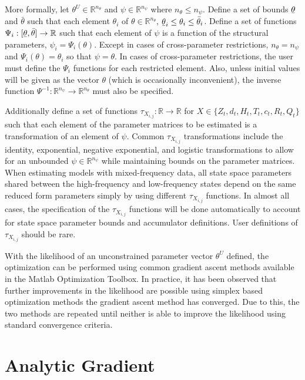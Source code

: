\documentclass[12pt]{article}
\newcommand{\ubar}[1]{\text{\b{$#1$}}}
\begin{document}
	More formally, let $\theta^U \in \mathbb{R}^{n_\theta}$ and $\psi \in \mathbb{R}^{n_\psi}$ where $n_\theta \leq n_\psi$. Define a set of bounds $\ubar{\theta}$  and $\bar{\theta}$ such that each element $\theta_i$ of $\theta \in \mathbb{R}^{n_\theta}$, $\ubar{\theta}_i \leq \theta_i \leq \bar{\theta}_i$. 
	Define a set of functions $\Psi_i: [\ubar{\theta}, \bar{\theta}] \rightarrow \mathbb{R}$ such that each element of $\psi$ is a function of the structural parameters, $\psi_i = \Psi_i(\theta)$. Except in cases of cross-parameter restrictions, $n_\theta = n_\psi$ and $\Psi_i(\theta) = \theta_i$ so that $\psi = \theta$. In cases of cross-parameter restrictions, the user must define the $\Psi_i$ functions for each restricted element. Also, unless initial values will be given as the vector $\theta$ (which is occasionally inconvenient), the inverse function $\Psi^{-1} : \mathbb{R}^{n_\psi} \rightarrow \mathbb{R}^{n_\theta}$ must also be specified.

	Additionally define a set of functions $\tau_{X_{i,j}}: \mathbb{R} \rightarrow \mathbb{R}$ for $X \in \{ Z_t, d_t, H_t, T_t, c_t, R_t, Q_t \}$ such that each element of the parameter matrices to be estimated is a transformation of an element of $\psi$. Common $\tau_{X_{i,j}}$ transformations include the identity, exponential, negative exponential, and logistic transformations to allow for an unbounded $\psi \in \mathbb{R}^{n_\psi}$ while maintaining bounds on the parameter matrices. When estimating models with mixed-frequency data, all state space parameters shared between the high-frequency and low-frequency states depend on the same reduced form parameters simply by using different $\tau_{X_{i,j}}$ functions. In almost all cases, the specification of the $\tau_{X_{i,j}}$ functions will be done automatically to account for state space parameter bounds and accumulator definitions. User definitions of $\tau_{X_{i,j}}$ should be rare. 

	With the likelihood of an unconstrained parameter vector $\theta^U$ defined, the optimization can be performed using common gradient ascent methods available in the Matlab Optimization Toolbox. In practice, it has been observed that further improvements in the likelihood are possible using simplex based optimization methods the gradient ascent method has converged. Due to this, the two methods are repeated until neither is able to improve the likelihood using standard convergence criteria. 

\appendix
\newpage

\section{Analytic Gradient}
\end{document}
